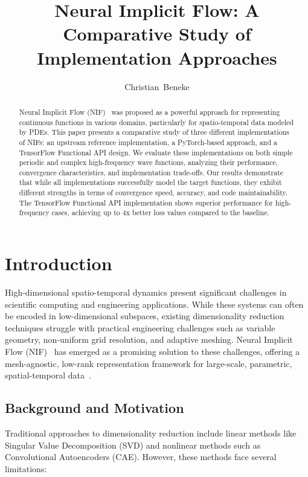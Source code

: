 \documentclass[10pt,journal,compsoc,onecolumn]{IEEEtran}
\begin{document}
\title{Neural Implicit Flow: A Comparative Study of Implementation Approaches}

\author{Christian~Beneke}

\maketitle

\begin{abstract}
Neural Implicit Flow (NIF)~\cite{nif2023} was proposed as a powerful approach for representing continuous functions in various domains, particularly for spatio-temporal data modeled by PDEs. This paper presents a comparative study of three different implementations of NIFs: an upstream reference implementation, a PyTorch-based approach, and a TensorFlow Functional API design. We evaluate these implementations on both simple periodic and complex high-frequency wave functions, analyzing their performance, convergence characteristics, and implementation trade-offs. Our results demonstrate that while all implementations successfully model the target functions, they exhibit different strengths in terms of convergence speed, accuracy, and code maintainability. The TensorFlow Functional API implementation shows superior performance for high-frequency cases, achieving up to 4x better loss values compared to the baseline.
\end{abstract}

\section{Introduction}
High-dimensional spatio-temporal dynamics present significant challenges in scientific computing and engineering applications. While these systems can often be encoded in low-dimensional subspaces, existing dimensionality reduction techniques struggle with practical engineering challenges such as variable geometry, non-uniform grid resolution, and adaptive meshing. Neural Implicit Flow (NIF)~\cite{nif2023} has emerged as a promising solution to these challenges, offering a mesh-agnostic, low-rank representation framework for large-scale, parametric, spatial-temporal data~\cite{neural_fields2022}.

\subsection{Background and Motivation}
Traditional approaches to dimensionality reduction include linear methods like Singular Value Decomposition (SVD) and nonlinear methods such as Convolutional Autoencoders (CAE). However, these methods face several limitations:
\end{document}
